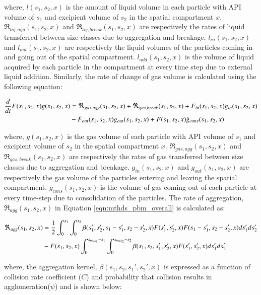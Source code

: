 \documentclass[preprint,10pt,authoryear]{elsarticle}
\begin{document}
\begin{linenumbers}
where, $l(s_1,s_2,x)$ is the amount of liquid volume in each particle with API volume of $s_1$ and 
excipient volume of $s_2$ in the spatial compartment $x$. $\Re_{liq,agg}(s_1,s_2,x)$ and 
$\Re_{liq,break}(s_1,s_2,x)$ are respectively the rates of liquid transferred between size classes due to 
aggregation and breakage. $l_{in}(s_1,s_2,x)$ and $l_{out}(s_1,s_2,x)$ are respectively the liquid 
volumes of the particles coming in and going out of the spatial compartment. $l_{add}(s_1,s_2,x)$ is 
the volume of liquid acquired by each particle in the compartment at every time step due to external 
liquid addition.
Similarly, the rate of change of gas volume is calculated using the following equation: 

\begin{align}
\frac{d}{dt}F(s_1,s_2,x)g(s_1,s_2,x)&= 
\Re_{gas,agg}(s_1,s_2,x)+\Re_{gas,break}(s_1,s_2,x)+\dot{F}_{in}(s_1,s_2,x)g_{in}(s_1,s_2,x)\notag\\
&-\dot{F}_{out}(s_1,s_2,x)g_{out}(s_1,s_2,x)+F(s_1,s_2,x)\dot{g}_{cons}(s_1,s_2,x)
\label{eqn:mthds_pbm_gas_agg} 
\end{align}

where, $g(s_1,s_2,x)$ is the gas volume of each particle with API volume of $s_1$ and excipient 
volume of $s_2$ in the spatial compartment $x$. $\Re_{gas,agg}(s_1,s_2,x)$ and 
$\Re_{gas,break}(s_1,s_2,x)$ are respectively the rates of gas transferred between size classes due to 
aggregation and breakage. $g_{in}(s_1,s_2,x)$ and $g_{out}(s_1,s_2,x)$ are respectively the gas 
volume of the particles entering and leaving the spatial compartment. $\dot{g}_{cons}(s_1,s_2,x)$ is the 
volume of gas coming out of each particle at every time-step due to consolidation of the particles. 
The rate of aggregation, $\Re_{agg}(s_1,s_2,x)$ in Equation \ref{eqn:mthds_pbm_overall} is 
calculated as: \citep{Chaturbedi2017}

\begin{align}
\Re_{agg}(s_1,s_2,x)&= \frac{1}{2}\int _0^{s_1} \int_0^{s_2} 
\beta(s_1',s_2',s_1-s_1',s_2-s_2',x)F(s_1',s_2',x)F(s_1-s_1',s_2-s_2',x)ds_1'ds_2'\notag\\ 
&- F(s_1,s_2,x)\int _0^{s_{max_1}-s_1} \int_0^{s_{max_2}-s_2} 
\beta(s_1,s_2,s_1',s_2',x)F(s_1',s_2',x)ds_1'ds_2'
\label{eqn:mthds_R_agg}
\end{align}


where, the aggregation kernel, $\beta(s_1,s_2, s_1',s_2',x)$ is expressed as a function of collision 
rate coefficient ($C$) and probability that collision results in agglomeration($\psi$) \citep{ingram2005}
and is shown below: 


\end{linenumbers}
\end{document}

